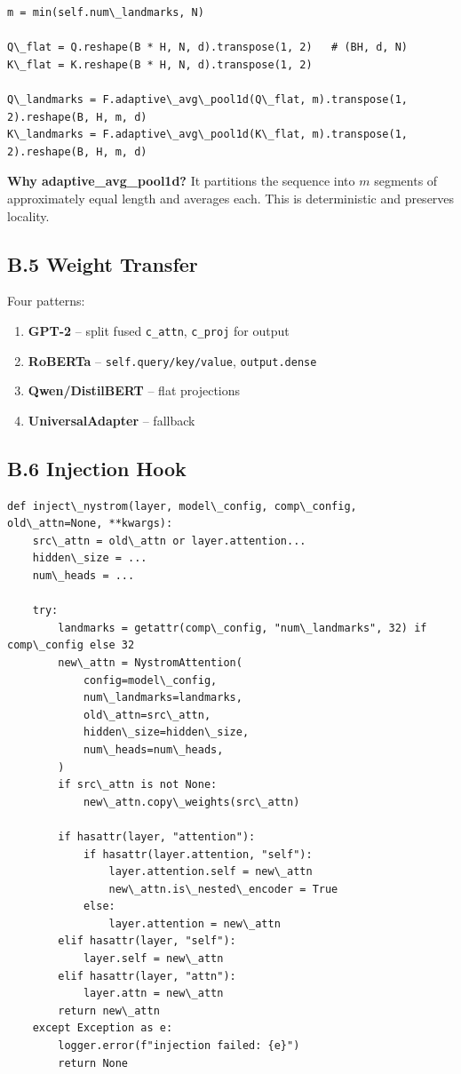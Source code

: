 \begin{lstlisting}
m = min(self.num\_landmarks, N)

Q\_flat = Q.reshape(B * H, N, d).transpose(1, 2)   # (BH, d, N)
K\_flat = K.reshape(B * H, N, d).transpose(1, 2)

Q\_landmarks = F.adaptive\_avg\_pool1d(Q\_flat, m).transpose(1, 2).reshape(B, H, m, d)
K\_landmarks = F.adaptive\_avg\_pool1d(K\_flat, m).transpose(1, 2).reshape(B, H, m, d)
\end{lstlisting}

\textbf{Why adaptive\_avg\_pool1d?} It partitions the sequence into $m$ segments 
of approximately equal length and averages each. This is deterministic and 
preserves locality.

\subsection{B.5 Weight Transfer}

Four patterns:

\begin{enumerate}
\item \textbf{GPT-2} -- split fused \texttt{c\_attn}, \texttt{c\_proj} for output
\item \textbf{RoBERTa} -- \texttt{self.query/key/value}, \texttt{output.dense}
\item \textbf{Qwen/DistilBERT} -- flat projections
\item \textbf{UniversalAdapter} -- fallback

\end{enumerate}
\subsection{B.6 Injection Hook}

\begin{lstlisting}
def inject\_nystrom(layer, model\_config, comp\_config, old\_attn=None, **kwargs):
    src\_attn = old\_attn or layer.attention...
    hidden\_size = ...
    num\_heads = ...
    
    try:
        landmarks = getattr(comp\_config, "num\_landmarks", 32) if comp\_config else 32
        new\_attn = NystromAttention(
            config=model\_config,
            num\_landmarks=landmarks,
            old\_attn=src\_attn,
            hidden\_size=hidden\_size,
            num\_heads=num\_heads,
        )
        if src\_attn is not None:
            new\_attn.copy\_weights(src\_attn)
        
        if hasattr(layer, "attention"):
            if hasattr(layer.attention, "self"):
                layer.attention.self = new\_attn
                new\_attn.is\_nested\_encoder = True
            else:
                layer.attention = new\_attn
        elif hasattr(layer, "self"):
            layer.self = new\_attn
        elif hasattr(layer, "attn"):
            layer.attn = new\_attn
        return new\_attn
    except Exception as e:
        logger.error(f"injection failed: {e}")
        return None
\end{lstlisting}

